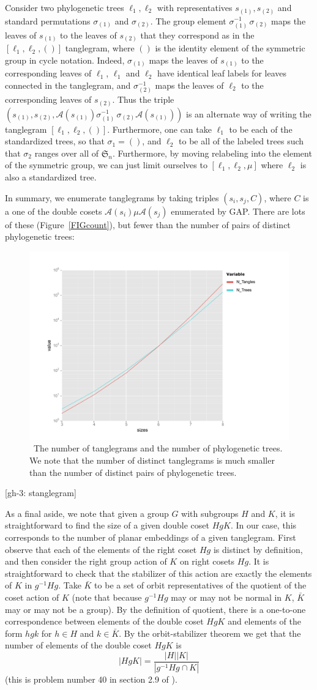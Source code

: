 \documentclass{amsart}
\newcommand{\fS}{\mathfrak S}
\newcommand{\aut}{\mathcal A}
\newcommand{\pairing}{\mu}
\newcommand{\id}{()}
\newcommand{\arxiv}[1]{#1}
\newcommand{\FIGcount}{\
\label{FIGcount}
\begin{figure}
  \arxiv{\includegraphics[width=5in]{figures/count}}
\caption{\
  The number of tanglegrams and the number of phylogenetic trees.
  We note that the number of distinct tanglegrams is much smaller than the number of distinct pairs of phylogenetic trees.
}
\end{figure}
}
\begin{document}
Consider two phylogenetic trees $\ell_1, \ell_2$ with representatives $s_{(1)}, s_{(2)}$ and standard permutations $\sigma_{(1)}$ and $\sigma_{(2)}$.
The group element $\sigma_{(1)}^{-1} \, \sigma_{(2)}$ maps the leaves of $s_{(1)}$ to the leaves of $s_{(2)}$ that they correspond as in the $[\ell_1, \ell_2, \id]$ tanglegram, where $\id$ is the identity element of the symmetric group in cycle notation.
Indeed, $\sigma_{(1)}$ maps the leaves of $s_{(1)}$ to the corresponding leaves of $\ell_1$, $\ell_1$ and $\ell_2$ have identical leaf labels for leaves connected in the tanglegram, and $\sigma_{(2)}^{-1}$ maps the leaves of $\ell_2$ to the corresponding leaves of $s_{(2)}$.
Thus the triple $(s_{(1)}, s_{(2)}, \aut(s_{(1)}) \sigma_{(1)}^{-1} \, \sigma_{(2)} \aut(s_{(1)}))$ is an alternate way of writing the tanglegram $[\ell_1, \ell_2, \id]$.
Furthermore, one can take $\ell_1$ to be each of the standardized trees, so that $\sigma_1 = \id$, and $\ell_2$ to be all of the labeled trees such that $\sigma_2$ ranges over all of $\fS_n$.
Furthermore, by moving relabeling into the element of the symmetric group, we can just limit ourselves to $[\ell_1, \ell_2, \pairing]$ where $\ell_2$ is also a standardized tree.

In summary, we enumerate tanglegrams by taking triples $(s_i, s_j, C)$, where $C$ is a one of the double cosets $\aut(s_i) \pairing \aut(s_j)$ enumerated by GAP.
There are lots of these (Figure~\ref{FIGcount}), but fewer than the number of pairs of distinct phylogenetic trees:
\FIGcount


[gh-3: stanglegram]

As a final aside, we note that given a group $G$ with subgroups $H$ and $K$, it is straightforward to find the size of a given double coset $HgK$.
In our case, this corresponds to the number of planar embeddings of a given tanglegram.
First observe that each of the elements of the right coset $Hg$ is distinct by definition, and then consider the right group action of $K$ on right cosets $Hg$.
It is straightforward to check that the stabilizer of this action are exactly the elements of $K$ in $g^{-1} H g$.
Take $\bar K$ to be a set of orbit representatives of the quotient of the coset action of $K$ (note that because $g^{-1} H g$ may or may not be normal in $K$, $\bar K$ may or may not be a group).
By the definition of quotient, there is a one-to-one correspondence between elements of the double coset $HgK$ and elements of the form $hgk$ for $h \in H$ and $k \in \bar K$.
By the orbit-stabilizer theorem we get that the number of elements of the double coset $HgK$ is
\begin{equation}
\label{eq:doubleCosetOrder}
|HgK| = \frac{|H| |K|}{|g^{-1} H g \cap K|}
\end{equation}
(this is problem number 40 in section 2.9 of \cite{herstein2006topics}).
\end{document}
